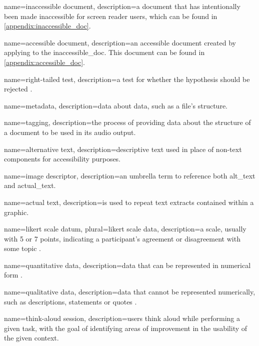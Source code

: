 {
	name={inaccessible document},
	description={a \latexspaced document that has intentionally been made inaccessible for screen reader users, which can be found in \cref{appendix:inaccessible_doc}.}
}

{
	name={accessible document},
	description={an accessible \latexspaced document created by applying \lintexspaced to the \gls{inaccessible_doc}. This document can be found in \cref{appendix:accessible_doc}.}
}

{
	name={right-tailed test},
	description={a test for whether the hypothesis should be rejected \parencite{right-tailed_test}.}
}

{
	name={metadata},
	description={data about data, such as a file's structure.}
}

{
	name={tagging},
	description={the process of providing data about the structure of a document to be used in its audio output.}
}

{
	name={alternative text},
	description={descriptive text used in place of non-text components for accessibility purposes.}
}

{
	name={image descriptor},
	description={an umbrella term to reference both \gls{alt_text} and \gls{actual_text}.}
}

{
	name={actual text},
	description={is used to repeat text extracts contained within a graphic.}
}

{
	name={likert scale datum},
	plural={likert scale data},
	description={a scale, usually with 5 or 7 points, indicating a participant's agreement or disagreement with some topic \parencite{likert}.}
}

{
	name={quantitative data},
	description={data that can be represented in numerical form \parencite{quan_data}.}
}

{
	name={qualitative data},
	description={data that cannot be represented numerically, such as descriptions, statements or quotes \parencite{qual_data}.}
}

{
	name={think-aloud session},
	description={users think aloud while performing a given task, with the goal of identifying areas of improvement in the usability of the given context.}
}

